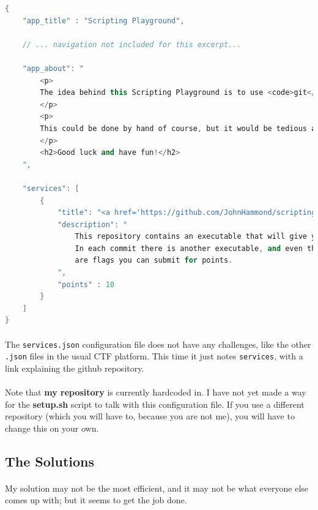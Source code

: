 \documentclass[11pt]{article}
\begin{document}
	\begin{lstlisting}[language=C++]
{
	"app_title" : "Scripting Playground",

	// ... navigation not included for this excerpt...

	"app_about": "
		<p>
		The idea behind this Scripting Playground is to use <code>git</code> as a vessel to teach <code>bash</code> scripting. In some commits, there is an executable file, that once run, will yield a flag based off of the current time. The goal is to write a script that will run through each commit, run each program, and submit each flag -- each minute.
		</p>
		<p>
		This could be done by hand of course, but it would be tedious and not very fruitful in regard to the game. So, the more you can script, the more you win!
		</p>
		<h2>Good luck and have fun!</h2>
	",

	"services": [
		{ 
			"title": "<a href='https://github.com/JohnHammond/scripting_playground'>A New github Repository</a>",
			"description": "
				This repository contains an executable that will give you a flag. 
				In each commit there is another executable, and even the commit SHA1 hashes themselves
				are flags you can submit for points.
			",
			"points" : 10
		}
	]
}
\end{lstlisting}

	\paragraph{} The \texttt{services.json} configuration file does not have any challenges, like the other \texttt{.json} files in the usual CTF platform. This time it just notes \texttt{services}, with a link explaining the github repository.

	\paragraph{} Note that \textbf{my repository} is currently hardcoded in. I have not yet made a way for the \textbf{setup.sh} script to talk with this configuration file. If you use a different repository (which you will have to, because you are not me), you will have to change this on your own.

	\newpage

	\subsection{The Solutions}

	\paragraph{} My solution may not be the most efficient, and it may not be what everyone else comes up with; but it seems to get the job done.
\end{document}
